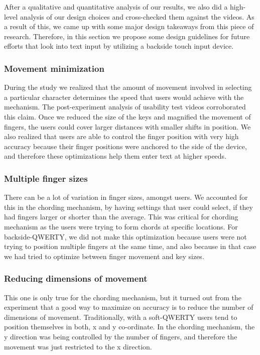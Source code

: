 After a qualitative and quantitative analysis of our results, we also did a high-level analysis of our design choices and cross-checked them against the videos. As a result of this, we came up with some major design takeaways from this piece of research. Therefore, in this section we propose some design guidelines for future efforts that look into text input by utilizing a backside touch input device. 

\subsubsection{Movement minimization}

During the study we realized that the amount of movement involved in selecting a particular character determines the speed that users would achieve with the mechanism. The post-experiment analysis of usability test videos corroborated this claim. Once we reduced the size of the keys and magnified the movement of fingers, the users could cover larger distances with smaller shifts in position. We also realized that users are able to control the finger position with very high accuracy because their finger positions were anchored to the side of the device, and therefore these optimizations help them enter text at higher speeds.

\subsubsection{Multiple finger sizes}

There can be a lot of variation in finger sizes, amongst users. We accounted for this in the chording mechanism, by having settings that user could select, if they had fingers larger or shorter than the
average. This was critical for chording mechanism as the users were trying to form chords at specific locations. For backside-QWERTY, we did not make this optimization because users were not trying to position multiple fingers at the same time, and also because in that case we had tried to optimize between finger movement and key sizes.

\subsubsection{Reducing dimensions of movement}

This one is only true for the chording mechanism, but it turned out from the experiment that a good way to maximize on accuracy is to reduce the number of dimensions of movement. Traditionally, with a soft-QWERTY users tend to position themselves in both, x and y co-ordinate. In the chording mechanism, the y direction was being controlled by the number of fingers, and therefore the movement was just restricted to the x direction.

